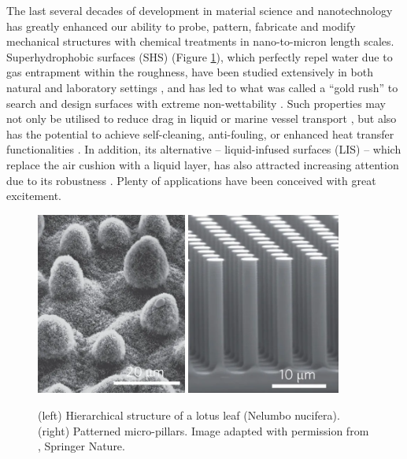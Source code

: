 The last several decades of development in material science and nanotechnology has greatly enhanced our ability to probe, pattern, fabricate and modify mechanical structures with chemical treatments in nano-to-micron length scales.
Superhydrophobic surfaces (SHS) (Figure \ref{fig:micro-surface}), which perfectly repel water due to gas entrapment within the roughness, have been studied extensively in both natural and laboratory settings \citep{plant_superhydro_1997, Onda_etal_1996}, and has led to what was called a ``gold rush'' to search and design surfaces with extreme non-wettability \citep{Bocquet}.
Such properties may not only be utilised to reduce drag in liquid or marine vessel transport \citep{Watanabe, Ou, Choi_Kim, Lee}, but also has the potential to achieve self-cleaning, anti-fouling, or enhanced heat transfer functionalities \citep{Blossey2003, Roach_etal_2008}.
In addition, its alternative -- liquid-infused surfaces (LIS) -- which replace the air cushion with a liquid layer, has also attracted increasing attention due to its robustness \citep{Solomon, Rosenberg, Wexler}.
Plenty of applications have been conceived with great excitement.

\begin{figure}%
  \centering
  \includegraphics[height=6cm]{lotus.png}
  \includegraphics[height=6cm]{micro-pillars.png}
  \caption{(left) Hierarchical structure of a lotus leaf (Nelumbo nucifera). (right) Patterned micro-pillars. Image adapted with permission from \cite{Bocquet}, \textcopyright \enspace Springer Nature.}
  \label{fig:micro-surface}
\end{figure}

